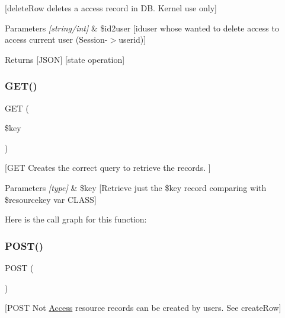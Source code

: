 \mbox{[}delete\+Row deletes a access record in DB. Kernel use only\mbox{]} 
\begin{DoxyParams}{Parameters}
{\em \mbox{[}string/int\mbox{]}} & \$id2user \mbox{[}iduser whose wanted to delete access to access current user (Session-\/$>$userid)\mbox{]} \\
\hline
\end{DoxyParams}
\begin{DoxyReturn}{Returns}
\mbox{[}J\+S\+ON\mbox{]} \mbox{[}state operation\mbox{]} 
\end{DoxyReturn}
\mbox{\label{class_access_a7490aac9922424f1e605adf9cda9a78b}} 
\subsubsection{\texorpdfstring{G\+E\+T()}{GET()}}
{\footnotesize\ttfamily G\+ET (\begin{DoxyParamCaption}\item[{}]{\$key }\end{DoxyParamCaption})}

\mbox{[}G\+ET Creates the correct query to retrieve the records. \mbox{]} 
\begin{DoxyParams}{Parameters}
{\em \mbox{[}type\mbox{]}} & \$key \mbox{[}Retrieve just the \$key record comparing with \$resourcekey var C\+L\+A\+SS\mbox{]} \\
\hline
\end{DoxyParams}
Here is the call graph for this function\+:
\mbox{\label{class_access_a2a7e865a6254f6af7005197d30ad1cc0}} 
\subsubsection{\texorpdfstring{P\+O\+S\+T()}{POST()}}
{\footnotesize\ttfamily P\+O\+ST (\begin{DoxyParamCaption}{ }\end{DoxyParamCaption})}

\mbox{[}P\+O\+ST Not \mbox{\hyperlink{class_access}{Access}} resource records can be created by users. See create\+Row\mbox{]} \mbox{\label{class_access_a2a21af1d6aaaa31249485c753b86eba1}} 
